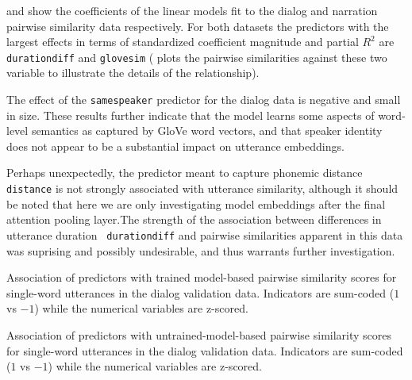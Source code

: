  and  show the coefficients
of the linear models fit to the dialog and narration pairwise
similarity data respectively. For both datasets the predictors with
the largest effects in terms of standardized coefficient magnitude and
partial $R^2$ are {\tt durationdiff} and {\tt glovesim}
( plots the pairwise similarities
against these two variable to illustrate the details of the
relationship).
 
The effect of
the {\tt samespeaker} predictor for the dialog data is negative and
small in size.  These results further indicate that the model learns
some aspects of word-level semantics as captured by GloVe word
vectors, and that speaker identity does not appear to be a substantial
impact on utterance embeddings.

Perhaps unexpectedly, the predictor meant to capture phonemic distance
{\tt distance} is not strongly associated with utterance similarity,
although it should be noted that here we are only investigating model
embeddings after the final attention pooling layer.The strength of
the association between differences in utterance duration {\tt
  durationdiff} and pairwise similarities apparent in this data was
suprising and possibly undesirable, and thus warrants further investigation.



\begin{table}
  \centering

\caption{Association of predictors with trained model-based pairwise
  similarity scores for single-word utterances in the dialog
  validation data. Indicators are sum-coded ($1$ vs $-1$) while the
  numerical variables are z-scored.}
\label{tab:dialog-lm}
\end{table}
\begin{table}
  \centering

\caption{Association of predictors with untrained-model-based pairwise
  similarity scores for single-word utterances in the dialog
  validation data. Indicators are sum-coded ($1$ vs $-1$) while the
  numerical variables are z-scored.}
\label{tab:dialog-lm_init}
\end{table}



